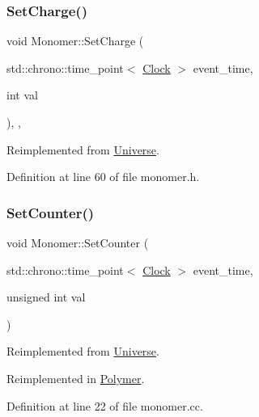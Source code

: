 \subsubsection{\texorpdfstring{Set\+Charge()}{SetCharge()}}
{\footnotesize\ttfamily void Monomer\+::\+Set\+Charge (\begin{DoxyParamCaption}\item[{std\+::chrono\+::time\+\_\+point$<$ \hyperlink{universe_8h_a0ef8d951d1ca5ab3cfaf7ab4c7a6fd80}{Clock} $>$}]{event\+\_\+time,  }\item[{int}]{val }\end{DoxyParamCaption})\hspace{0.3cm}{\ttfamily [inline]}, {\ttfamily [final]}, {\ttfamily [virtual]}}



Reimplemented from \hyperlink{class_universe_a3b3da7c86a7b75e5e5c0b7972ac82a87}{Universe}.



Definition at line 60 of file monomer.\+h.

\mbox{\label{class_monomer_a6f0dfa4382b3d4fa19b7ee0fb8fe7a55}} 
\subsubsection{\texorpdfstring{Set\+Counter()}{SetCounter()}}
{\footnotesize\ttfamily void Monomer\+::\+Set\+Counter (\begin{DoxyParamCaption}\item[{std\+::chrono\+::time\+\_\+point$<$ \hyperlink{universe_8h_a0ef8d951d1ca5ab3cfaf7ab4c7a6fd80}{Clock} $>$}]{event\+\_\+time,  }\item[{unsigned int}]{val }\end{DoxyParamCaption})\hspace{0.3cm}{\ttfamily [virtual]}}



Reimplemented from \hyperlink{class_universe_aa22202ae740eb1355529afcb13285e91}{Universe}.



Reimplemented in \hyperlink{class_polymer_a1500ffc682396af2f4306c7c7ea7fd87}{Polymer}.



Definition at line 22 of file monomer.\+cc.

